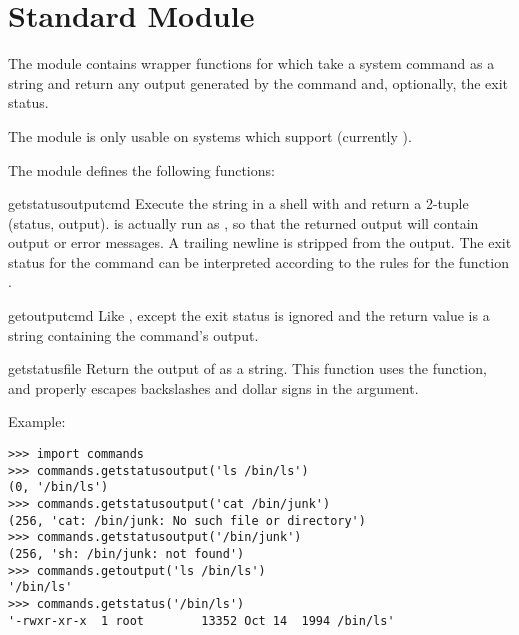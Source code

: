 \section{Standard Module }
\label{module-commands}

The  module contains wrapper functions for  
which take a system command as a string and return any output generated by 
the command and, optionally, the exit status.

The  module is only usable on systems which support 
 (currently \UNIX{}).

The  module defines the following functions:

\begin{funcdesc}{getstatusoutput}{cmd}
Execute the string  in a shell with  and return
a 2-tuple (status, output).   is actually run as
, so that the returned output will contain output
or error messages. A trailing newline is stripped from the output.
The exit status for the  command can be interpreted according to the
rules for the \C{} function .  
\end{funcdesc}

\begin{funcdesc}{getoutput}{cmd}
Like , except the exit status is ignored and
the return value is a string containing the command's output.  
\end{funcdesc}

\begin{funcdesc}{getstatus}{file}
Return the output of  as a string.  This
function uses the  function, and properly escapes
backslashes and dollar signs in the argument.
\end{funcdesc}

Example:

\begin{verbatim}
>>> import commands
>>> commands.getstatusoutput('ls /bin/ls')
(0, '/bin/ls')
>>> commands.getstatusoutput('cat /bin/junk')
(256, 'cat: /bin/junk: No such file or directory')
>>> commands.getstatusoutput('/bin/junk')
(256, 'sh: /bin/junk: not found')
>>> commands.getoutput('ls /bin/ls')
'/bin/ls'
>>> commands.getstatus('/bin/ls')
'-rwxr-xr-x  1 root        13352 Oct 14  1994 /bin/ls'
\end{verbatim}
